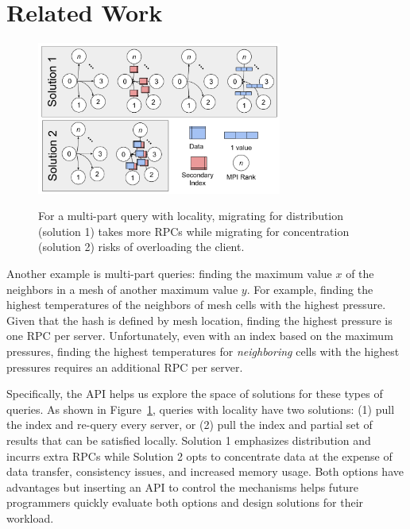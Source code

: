 \section{Related Work}

\begin{figure}[t]
  \noindent\includegraphics[width=19pc,angle=0]{figures/example.png}\\
  \caption{For a multi-part query with locality, migrating for distribution
  (solution 1) takes more RPCs while migrating for concentration (solution 2)
  risks of overloading the client.}
  \label{fig:example}
\end{figure}

Another example is multi-part queries: finding the maximum value \(x\) of the
neighbors in a mesh of another maximum value \(y\).  For example, finding the
highest temperatures of the neighbors of mesh cells with the highest pressure.
Given that the hash is defined by mesh location, finding the highest pressure
is one RPC per server.  Unfortunately, even with an index based on the maximum
pressures, finding the highest temperatures for {\it neighboring} cells with
the highest pressures requires an additional RPC per server. 

Specifically, the API helps us explore the space of solutions for these types
of queries. As shown in Figure~\ref{fig:example}, queries with locality have
two solutions: (1) pull the index and re-query every server, or (2) pull the
index and partial set of results that can be satisfied locally. Solution 1
emphasizes distribution and incurrs extra RPCs while Solution 2 opts to
concentrate data at the expense of data transfer, consistency issues, and
increased memory usage.  Both options have advantages but inserting an API to
control the mechanisms helps future programmers quickly evaluate both options
and design solutions for their workload.



